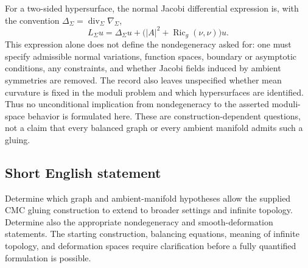 \documentclass[11pt]{article}
\begin{document}
For a two-sided hypersurface, the normal Jacobi differential expression is, with the convention \(\Delta_{\Sigma}=\operatorname{div}_{\Sigma}\nabla_{\Sigma}\),
\[
L_{\Sigma}u=\Delta_{\Sigma}u+
\bigl(|A|^2+\operatorname{Ric}_g(\nu,\nu)\bigr)u.
\]
This expression alone does not define the nondegeneracy asked for: one must specify admissible normal variations, function spaces, boundary or asymptotic conditions, any constraints, and whether Jacobi fields induced by ambient symmetries are removed. The record also leaves unspecified whether mean curvature is fixed in the moduli problem and which hypersurfaces are identified. Thus no unconditional implication from nondegeneracy to the asserted moduli-space behavior is formulated here. These are construction-dependent questions, not a claim that every balanced graph or every ambient manifold admits such a gluing.
\subsection{Short English statement}
Determine which graph and ambient-manifold hypotheses allow the supplied CMC gluing construction to extend to broader settings and infinite topology. Determine also the appropriate nondegeneracy and smooth-deformation statements. The starting construction, balancing equations, meaning of infinite topology, and deformation spaces require clarification before a fully quantified formulation is possible.
\end{document}
